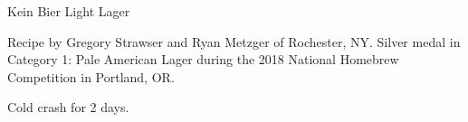 \begin{recipe}{Kein Bier Light Lager}

\begin{aboutblock}
Recipe by Gregory Strawser and Ryan Metzger of Rochester, NY. Silver medal in
Category 1: Pale American Lager during the 2018 National Homebrew Competition in
Portland, OR.
\sourceaha
\end{aboutblock}


\begin{methodandtiming}

\begin{mashsteps}
\end{mashsteps}

\begin{fermentationsteps}
\end{fermentationsteps}

\begin{directions}
Cold crash for 2 days.
\end{directions}

\end{methodandtiming}

\recipebreak

\begin{ingredientsblock}

\begin{malts}
\end{malts}

\begin{hops}
\end{hops}


\end{ingredientsblock}

\end{recipe}

